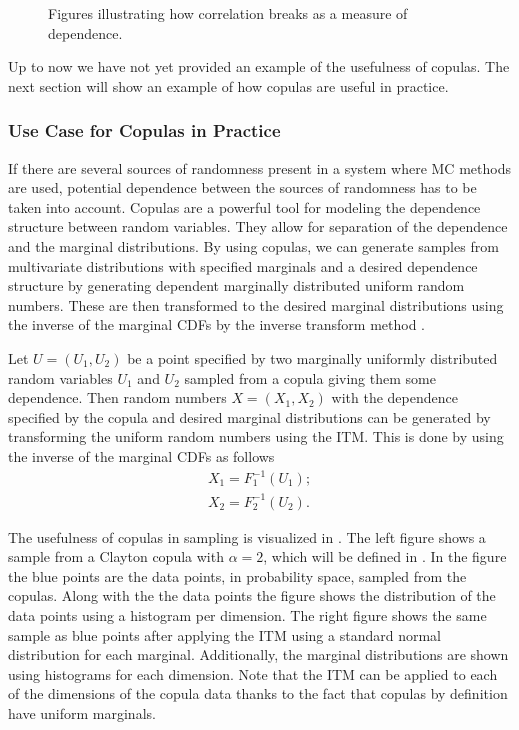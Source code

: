 \begin{figure}
\begin{minipage}{0.45\textwidth}
        \label{fig:exponentialDependenceScatterRet}
    \end{minipage}
    \caption{Figures illustrating how correlation breaks as a measure of dependence.}
    \label{fig:ExamplePlots}
\end{figure}

Up to now we have not yet provided an example of the usefulness of copulas. The next section will show an example of how copulas are useful in practice.

\subsubsection{Use Case for Copulas in Practice}\label{sec:CopulaUseCase}
If there are several sources of randomness present in a system where \gls{MC} methods are used, potential dependence between the sources of randomness has to be taken into account. Copulas are a powerful tool for modeling the dependence structure between random variables. They allow for separation of the dependence and the marginal distributions. By using copulas, we can generate samples from multivariate distributions with specified marginals and a desired dependence structure by generating dependent marginally distributed uniform random numbers. These are then transformed to the desired marginal distributions using the inverse of the marginal \gls{CDF}s by the inverse transform method .

Let $U = (U_1,U_2)$ be a point specified by two marginally uniformly distributed random variables $U_1$ and $U_2$ sampled from a copula giving them some dependence. Then random numbers $X = (X_1,X_2)$ with the dependence specified by the copula and desired marginal distributions can be generated by transforming the uniform random numbers using the \gls{ITM}. This is done by using the inverse of the marginal \gls{CDF}s as follows
\begin{align*}
    X_1 = F_1^{-1}(U_1); \\
    X_2 = F_2^{-1}(U_2).
\end{align*}

The usefulness of copulas in sampling is visualized in . The left figure shows a sample from a Clayton copula with $\alpha = 2$, which will be defined in . In the figure the blue points are the data points, in probability space, sampled from the copulas. Along with the the data points the figure shows the distribution of the data points using a histogram per dimension. The right figure shows the same sample as blue points after applying the \gls{ITM} using a standard normal distribution for each marginal. Additionally, the marginal distributions are shown using histograms for each dimension. Note that the \gls{ITM} can be applied to each of the dimensions of the copula data thanks to the fact that copulas by definition have uniform marginals. 

